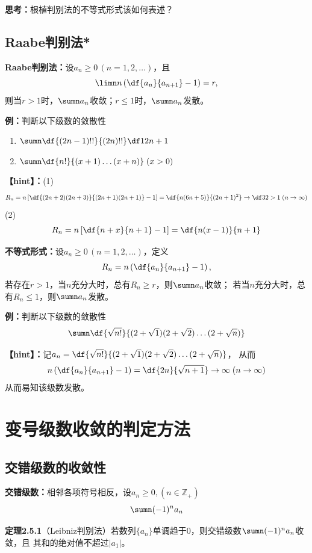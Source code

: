 {\bf 思考：}根植判别法的不等式形式该如何表述？

\begin{shaded}

\subsection{Raabe判别法*}

{\bf Raabe判别法：}设$a_n\geq 0\,(n=1,2,\ldots)$，且
$$\limn n\left(\df{a_n}{a_{n+1}}-1\right)=r,$$
则当$r>1$时，$\sumn a_n$收敛；$r\leq 1$时，$\sumn a_n$发散。	

{\bf 例：}判断以下级数的敛散性
\begin{enumerate}[(1)]
  \setlength{\itemindent}{1cm}
  \item $\sumn\df{(2n-1)!!}{(2n)!!}\df 1{2n+1}$
  \item $\sumn\df{n!}{(x+1)\ldots(x+n)}\;(x>0)$
\end{enumerate}

{\bf 【hint】：}(1)
$$R_n=n\left[\df{(2n+2)(2n+3)}{(2n+1)(2n+1)}-1\right]
=\df{n(6n+5)}{(2n+1)^2}\to\df32>1\;(n\to\infty)$$
(2)
$$R_n=n\left[\df{n+x}{n+1}-1\right]=\df{n(x-1)}{n+1}$$

{\bf 不等式形式：}设$a_n\geq 0\,(n=1,2,\ldots)$，定义
$$R_n=n\left(\df{a_n}{a_{n+1}}-1\right),$$
若存在$r>1$，当$n$充分大时，总有$R_n\geq r$，则$\sumn a_n$收敛；
若当$n$充分大时，总有$R_n\leq 1$，则$\sumn a_n$发散。

{\bf 例：}判断以下级数的敛散性
$$\sumn\df{\sqrt{n!}}{(2+\sqrt 1)(2+\sqrt 2)\ldots(2+\sqrt n)}$$

{\bf 【hint】：}记$a_n=\df{\sqrt{n!}}{(2+\sqrt 1)(2+\sqrt 2)\ldots(2+\sqrt n)}$，
从而
$$n\left(\df{a_n}{a_{n+1}}-1\right)=\df{2n}{\sqrt{n+1}}\to\infty\;(n\to\infty)$$
从而易知该级数发散。

\end{shaded}

\section{变号级数收敛的判定方法}

\subsection{交错级数的收敛性}

{\bf 交错级数：}相邻各项符号相反，设$a_n\geq 0,(n\in\mathbb{Z}_+)$
$$\sumn(-1)^na_n$$

{\bf 定理2.5.1}（Leibniz判别法）若数列$\{a_n\}$单调趋于$0$，则交错级数$\sumn (-1)^na_n$收敛，且
其和的绝对值不超过$|a_1|$。


